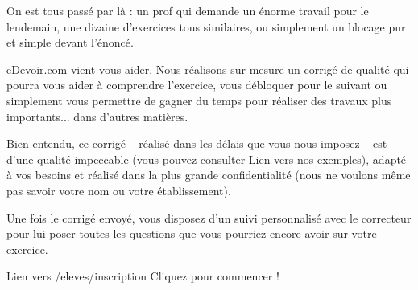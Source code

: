 On est tous passé par là : un prof qui demande un énorme travail pour le lendemain, une dizaine d'exercices tous similaires, ou simplement un blocage pur et simple devant l'énoncé.

eDevoir.com vient vous aider. Nous réalisons sur mesure un corrigé de qualité qui pourra vous aider à comprendre l'exercice, vous débloquer pour le suivant ou simplement vous permettre de gagner du temps pour réaliser des travaux plus importants... dans d'autres matières.

Bien entendu, ce corrigé -- réalisé dans les délais que vous nous imposez -- est d'une qualité impeccable (vous pouvez consulter {Lien vers nos exemples}), adapté à vos besoins et réalisé dans la plus grande confidentialité (nous ne voulons même pas savoir votre nom ou votre établissement).

Une fois le corrigé envoyé, vous disposez d'un suivi personnalisé avec le correcteur pour lui poser toutes les questions que vous pourriez encore avoir sur votre exercice.

Lien vers /eleves/inscription Cliquez pour commencer !